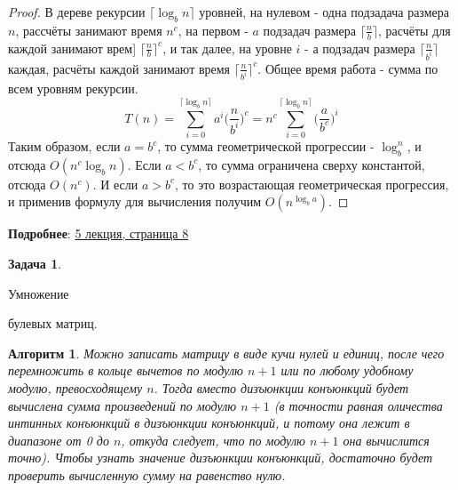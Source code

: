 \documentclass[a4paper]{article}
\theoremstyle{indented}
\newtheorem{alg}{Алгоритм}
\theoremstyle{definition}
\newtheorem{prob}{Задача}
\theoremstyle{remark}
\begin{document}
\begin{proof}
    В дереве рекурсии $\lceil \log_b n \rceil$ уровней, на нулевом - одна подзадача размера $n$, рассчёты занимают время $n^c$, на первом - $a$ подзадач размера $\lceil \frac{n}{b} \rceil$, расчёты для каждой занимают врем] $\lceil \frac{n}{b} \rceil^c$, и так далее, на уровне $i$ - а подзадач размера $\lceil \frac{n}{b^i}\rceil$ каждая, расчёты каждой занимают время $\lceil \frac{n}{b^i}\rceil^c$. Общее время работа - сумма по всем уровням рекурсии.
    \[
        T(n)= \sum_{i=0}^{\lceil \log_b n \rceil} a^i\biggl(\frac{n}{b^i}\biggr)^c=n^c \sum_{i=0}^{\lceil \log_b n \rceil} \biggl(\frac{a}{b^c}\biggr)^i
    \] 
    Таким образом, если $a=b^c$, то сумма геометрической прогрессии - $\log_b^n$, и отсюда $O(n^c\log_b n)$. Если $a<b^c$, то сумма ограничена сверху константой, отсюда $O(n^c)$. И если $a>b^c$, то это возрастающая геометрическая прогрессия, и применив формулу для вычисления получим $O(n^{\log_b a})$. 
\end{proof}

\textbf{Подробнее}: \href{https://users.math-cs.spbu.ru/~okhotin/teaching/algorithms_2020/okhotin_algorithms_2020_l5.pdf}{5 лекция, страница 8}

\begin{prob}
    \hypertarget{e2}{Умножение} булевых матриц.
\end{prob}

\begin{alg}
    Можно записать матрицу в виде кучи нулей и единиц, после чего перемножить в кольце вычетов по модулю $n+1$ или по любому удобному модулю, превосходящему $n$. Тогда вместо дизъюнкции конъюнкций будет вычислена сумма произведений по модулю $n+1$ (в точности равная оличества интинных конъюнкций в дизъюнкции конъюнкций, и потому она лежит в диапазоне от 0 до $n$, откуда следует, что по модулю $n+1$ она вычислится точно). Чтобы узнать значение дизъюнкции конъюнкций, достаточно будет проверить вычисленную сумму на равенство нулю.
\end{alg} \ 
\end{document}
